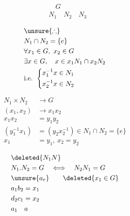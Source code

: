 
\[\begin{aligned}&\quad G\\ &N_1\quad N_2\quad N_3\end{aligned}\]


\[
\begin{aligned}
&\unsure{\therefore}\\
&N_1\cap N_2=\{e\}\\
&\forall x_1\in G,\ x_2\in G\\
&\exists x\in G,\quad x\in x_1N_1\cap x_2N_2\\
&\text{i.e. }\left\{\begin{aligned}x_1^{-1}x&\in N_1\\x_2^{-1}x&\in N_2\end{aligned}\right.
\end{aligned}
\]

\[
\begin{aligned}
N_1\times N_2&\longrightarrow G\\
(x_1,x_2)&\longrightarrow x_1x_2\\
x_1x_2&=y_1y_2\\
(y_1^{-1}x_1)&=(y_2x_2^{-1})\in N_1\cap N_2=\{e\}\\
x_1&=y_1,\ x_2=y_2
\end{aligned}
\]

\[
\begin{aligned}
&\deleted{N_1N}\\
&N_1.N_2=G\quad\Longleftrightarrow\quad N_2N_1=G\\
&\unsure{a_r}\qquad \deleted{x_1\in G}\\
&a_1b_2=x_1\\&d_2c_1=x_2\\&a_{1} \quad a
\end{aligned}
\]


